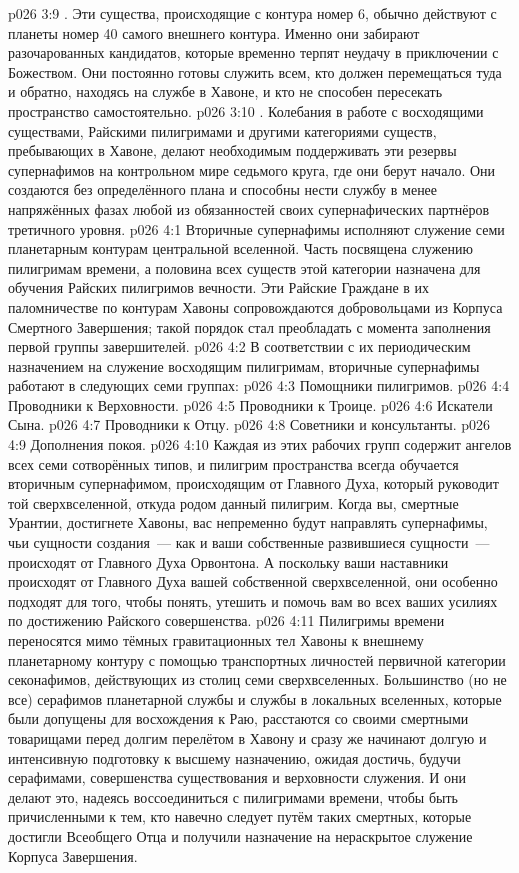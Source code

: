 \vs p026 3:9 . Эти существа, происходящие с контура номер 6, обычно действуют с планеты номер 40 самого внешнего контура. Именно они забирают разочарованных кандидатов, которые временно терпят неудачу в приключении с Божеством. Они постоянно готовы служить всем, кто должен перемещаться туда и обратно, находясь на службе в Хавоне, и кто не способен пересекать пространство самостоятельно.
\vs p026 3:10 . Колебания в работе с восходящими существами, Райскими пилигримами и другими категориями существ, пребывающих в Хавоне, делают необходимым поддерживать эти резервы супернафимов на контрольном мире седьмого круга, где они берут начало. Они создаются без определённого плана и способны нести службу в менее напряжённых фазах любой из обязанностей своих супернафических партнёров третичного уровня.
\vs p026 4:1 Вторичные супернафимы исполняют служение семи планетарным контурам центральной вселенной. Часть посвящена служению пилигримам времени, а половина всех существ этой категории назначена для обучения Райских пилигримов вечности. Эти Райские Граждане в их паломничестве по контурам Хавоны сопровождаются добровольцами из Корпуса Смертного Завершения; такой порядок стал преобладать с момента заполнения первой группы завершителей.
\vs p026 4:2 \pc В соответствии с их периодическим назначением на служение восходящим пилигримам, вторичные супернафимы работают в следующих семи группах:
\vs p026 4:3 Помощники пилигримов.
\vs p026 4:4 Проводники к Верховности.
\vs p026 4:5 Проводники к Троице.
\vs p026 4:6 Искатели Сына.
\vs p026 4:7 Проводники к Отцу.
\vs p026 4:8 Советники и консультанты.
\vs p026 4:9 Дополнения покоя.
\vs p026 4:10 \pc Каждая из этих рабочих групп содержит ангелов всех семи сотворённых типов, и пилигрим пространства всегда обучается вторичным супернафимом, происходящим от Главного Духа, который руководит той сверхвселенной, откуда родом данный пилигрим. Когда вы, смертные Урантии, достигнете Хавоны, вас непременно будут направлять супернафимы, чьи сущности создания~--- как и ваши собственные развившиеся сущности~--- происходят от Главного Духа Орвонтона. А поскольку ваши наставники происходят от Главного Духа вашей собственной сверхвселенной, они особенно подходят для того, чтобы понять, утешить и помочь вам во всех ваших усилиях по достижению Райского совершенства.
\vs p026 4:11 Пилигримы времени переносятся мимо тёмных гравитационных тел Хавоны к внешнему планетарному контуру с помощью транспортных личностей первичной категории секонафимов, действующих из столиц семи сверхвселенных. Большинство (но не все) серафимов планетарной службы и службы в локальных вселенных, которые были допущены для восхождения к Раю, расстаются со своими смертными товарищами перед долгим перелётом в Хавону и сразу же начинают долгую и интенсивную подготовку к высшему назначению, ожидая достичь, будучи серафимами, совершенства существования и верховности служения. И они делают это, надеясь воссоединиться с пилигримами времени, чтобы быть причисленными к тем, кто навечно следует путём таких смертных, которые достигли Всеобщего Отца и получили назначение на нераскрытое служение Корпуса Завершения.
